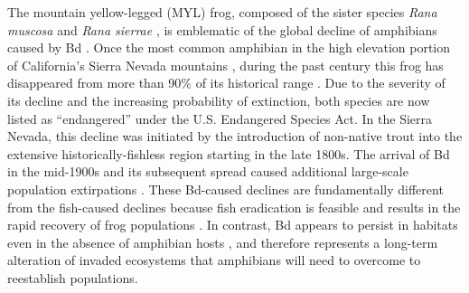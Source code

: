 \documentclass[9pt,twocolumn,twoside,lineno]{pnas-new}
\begin{document}
The mountain yellow-legged (MYL) frog, composed of the sister species
\emph{Rana muscosa} and \emph{Rana sierrae} \citep{vredenburg2007}, is
emblematic of the global decline of amphibians caused by Bd
\citep{scheele2019}. Once the most common amphibian in the high
elevation portion of California's Sierra Nevada mountains
\citep[USA,][]{grinnell1924}, during the past century this frog has
disappeared from more than 90\% of its historical range
\citep{vredenburg2007}. Due to the severity of its decline and the
increasing probability of extinction, both species are now listed as
``endangered'' under the U.S. Endangered Species Act. In the Sierra
Nevada, this decline was initiated by the introduction of non-native
trout into the extensive historically-fishless region
\citep{bradford1989, knapp2000} starting in the late 1800s. The arrival
of Bd in the mid-1900s and its subsequent spread \citep{vredenburg2019}
caused additional large-scale population extirpations
\citep{vredenburg2010, rachowicz2006}. These Bd-caused declines are
fundamentally different from the fish-caused declines because fish
eradication is feasible \citep{knapp1998} and results in the rapid
recovery of frog populations \citep{knapp2007, vredenburg2004}. In
contrast, Bd appears to persist in habitats even in the absence of
amphibian hosts \citep{walker2007}, and therefore represents a long-term
alteration of invaded ecosystems that amphibians will need to overcome
to reestablish populations.
\end{document}

